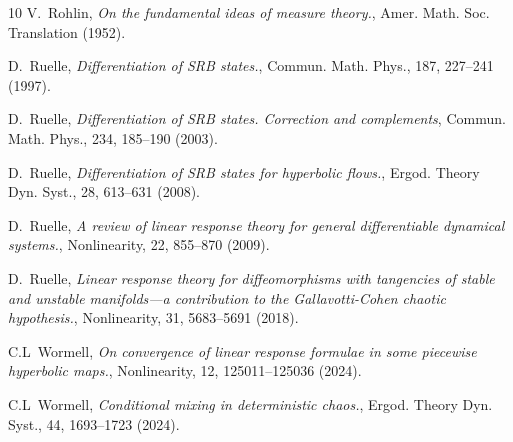 \documentclass{amsart}
\numberwithin{equation}{section}
\begin{document}
\begin{thebibliography}{10}
 V.~Rohlin, \emph{On the fundamental ideas of measure theory.}, Amer. Math. Soc. Translation (1952).

 D.~Ruelle, \emph{Differentiation of SRB states.}, Commun. Math. Phys., 187, 227--241 (1997).

 D.~Ruelle, \emph{Differentiation of SRB states. Correction and complements}, Commun. Math. Phys., 234, 185--190 (2003).

  D.~Ruelle, \emph{Differentiation of SRB states for hyperbolic flows.}, Ergod. Theory Dyn. Syst., 28, 613--631 (2008). 

 D.~Ruelle, \emph{A review of linear response theory for general differentiable dynamical systems.}, Nonlinearity, 22, 855--870 (2009).

 D.~Ruelle, \emph{Linear response theory for diffeomorphisms with tangencies of stable and
unstable manifolds—a contribution to the Gallavotti-Cohen chaotic hypothesis.}, Nonlinearity, 31, 5683--5691 (2018).


 C.L~Wormell, \emph{On convergence of linear response formulae in some piecewise hyperbolic maps.}, Nonlinearity,
12, 125011--125036 (2024).

 C.L~Wormell, \emph{Conditional mixing in deterministic chaos.}, Ergod. Theory Dyn. Syst., 44, 1693--1723 (2024).

\end{thebibliography}
\end{document}
